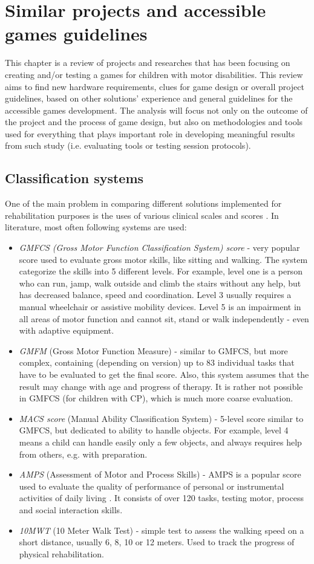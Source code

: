 \section{Similar projects and accessible games guidelines}
This chapter is a review of projects and researches that has been focusing on creating and/or testing a games for children with motor disabilities. This review aims to find new hardware requirements, clues for game design or overall project guidelines, based on other solutions' experience and general guidelines for the accessible games development. The analysis will focus not only on the outcome of the project and the process of game design, but also on methodologies and tools used for everything that plays important role in developing meaningful results from such study (i.e. evaluating tools or testing session protocols). 

\subsection{Classification systems}
One of the main problem in comparing different solutions implemented for rehabilitation purposes is the uses of various clinical scales and scores \cite{review}. In literature, most often following systems are used:
\begin{itemize}
\item \emph{GMFCS (Gross Motor Function Classification System) score} - very popular score used to evaluate gross motor skills, like sitting and walking. The system categorize the skills into 5 different levels. For example, level one is a person who can run, jamp, walk outside and climb the stairs without any help, but has decreased balance, speed and coordination. Level 3 usually requires a manual wheelchair or assistive mobility devices. Level 5 is an impairment in all areas of motor function and cannot sit, stand or walk independently - even with adaptive equipment\cite{gmfcs}.
\item \emph{GMFM} (Gross Motor Function Measure) - similar to GMFCS, but more complex, containing (depending on version) up to 83 individual tasks that have to be evaluated to get the final score. Also, this system assumes that the result may change with age and progress of therapy. It is rather not possible in GMFCS (for children with CP), which is much more coarse evaluation.
\item \emph{MACS score} (Manual Ability Classification System) - 5-level score similar to GMFCS, but dedicated to ability to handle objects. For example, level 4 means a child can handle easily only a few objects, and always requires help from others, e.g. with preparation.
\item \emph{AMPS} (Assessment of Motor and Process Skills) - AMPS is a popular score used to evaluate the quality of performance of personal or instrumental activities of daily living \cite{amps}. It consists of over 120 tasks, testing motor, process and social interaction skills\cite{amps}. 
\item \emph{10MWT} (10 Meter Walk Test) - simple test to assess the walking speed on a short distance, usually 6, 8, 10 or 12 meters. Used to track the progress of physical rehabilitation\cite{10mwt}.
\end{itemize}
